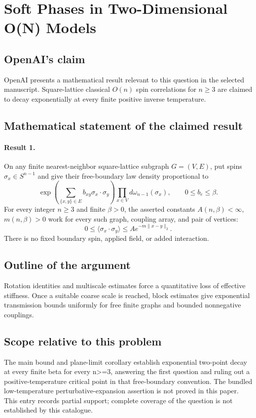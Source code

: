\documentclass[11pt]{article}
\begin{document}
\section*{Soft Phases in Two-Dimensional O(N) Models}

\subsection{OpenAI's claim}
OpenAI presents a mathematical result relevant to this question in the selected manuscript. Square-lattice classical $O(n)$ spin correlations for $n\geq3$ are claimed to decay exponentially at every finite positive inverse temperature.

\subsection{Mathematical statement of the claimed result}
\paragraph{Result 1.} On any finite nearest-neighbor square-lattice subgraph \(G=(V,E)\), put spins \(\sigma_x\in S^{n-1}\) and give their free-boundary law density proportional to
\[
 \exp\!\left(\sum_{\{x,y\}\in E}b_{xy}\sigma_x\cdot\sigma_y\right)
 \prod_{x\in V}d\omega_{n-1}(\sigma_x),\qquad 0\le b_e\le\beta.
\]
For every integer \(n\ge3\) and finite \(\beta>0\), the asserted constants \(A(n,\beta)<\infty\), \(m(n,\beta)>0\) work for every such graph, coupling array, and pair of vertices:
\[
 0\le\langle\sigma_x\cdot\sigma_y\rangle\le A e^{-m\|x-y\|_2}.
\]
There is no fixed boundary spin, applied field, or added interaction.

\subsection{Outline of the argument}
Rotation identities and multiscale estimates force a quantitative loss of effective stiffness. Once a suitable coarse scale is reached, block estimates give exponential transmission bounds uniformly for free finite graphs and bounded nonnegative couplings.

\subsection{Scope relative to this problem}
The main bound and plane-limit corollary establish exponential two-point decay at every finite beta for every n>=3, answering the first question and ruling out a positive-temperature critical point in that free-boundary convention. The bundled low-temperature perturbative-expansion assertion is not proved in this paper. This entry records partial support; complete coverage of the question is not established by this catalogue.
\end{document}

